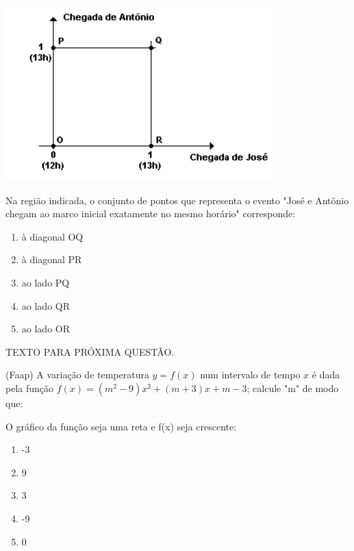 				\begin{center}
				\includegraphics[scale=0.7]{figuras/fig24.png}
				\end{center}
				
				Na região indicada, o conjunto de pontos que representa o evento "José e Antônio chegam ao marco inicial exatamente no mesmo horário" corresponde:
				\begin{multicols}{4}
				\begin{enumerate}
					\item à diagonal OQ
					\item à diagonal PR
					\item ao lado PQ
					\item ao lado QR
					\item ao lado OR
				\end{enumerate}
				\end{multicols}
				
				\begin{center}
				\uppercase{texto para próxima questão.}
				\end{center}
				
				(Faap) A variação de temperatura $y=f(x)$ num intervalo
de tempo $x$ é dada pela função $f(x)=(m^2-9)x^2+(m+3)x+m-3$; calcule "m" de modo que:
				\item O gráfico da função seja uma reta e f(x) seja crescente:
				\begin{multicols}{5}
				\begin{enumerate}
					\item -3
					\item 9
					\item 3
					\item -9
					\item 0
				\end{enumerate}
				\end{multicols}
				
